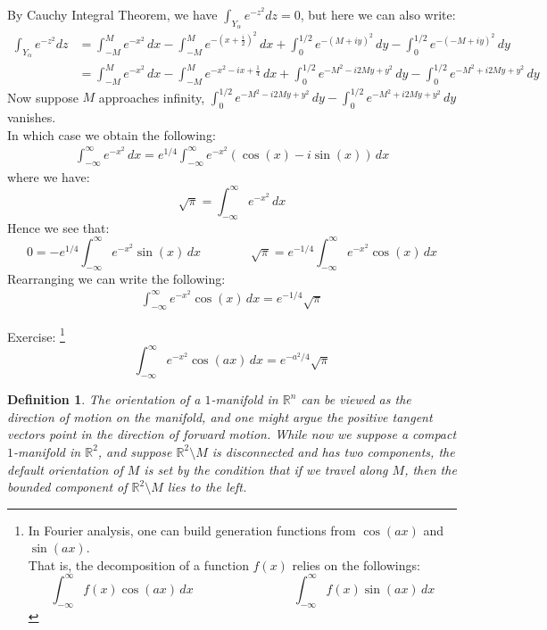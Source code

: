 \documentclass[11pt,oneside]{book}
\theoremstyle{break}
\theoremstyle{break}
\newtheorem{defn}{Definition}[corL]
\newcommand{\R}{\mathbb{R}}
\newcommand{\exercise}{\color{green}Exercise: \color{black}}
\begin{document}
By Cauchy Integral Theorem, we have $\int_{Y_\alpha} e^{-z^2} dz = 0$, but here we can also write:
\begin{align*}
\int_{Y_\alpha}e^{-z^2} dz &= \int_{-M}^M e^{-x^2}\, dx - \int_{-M}^M e^{-\left(x+\frac{i}{2}\right)^2} \,dx + \int_{0}^{1/2} e^{-(M+iy)^2} \, dy - \int_0^{1/2}e^{-(-M+iy)^2}\, dy\\
&= \int_{-M}^M e^{-x^2}\, dx - \int_{-M}^M e^{-x^2 - ix + \frac{1}{4}} \, dx + \int_0^{1/2} e^{-M^2 - i2My + y^2} \, dy - \int_0^{1/2} e^{-M^2 + i2My + y^2} \, dy
\end{align*}
Now suppose $M$ approaches infinity, $\int_0^{1/2} e^{-M^2 - i2My + y^2} \, dy - \int_0^{1/2} e^{-M^2 + i2My + y^2} \, dy$ vanishes.\\ 
In which case we obtain the following:
\begin{align*}
\int_{-\infty}^{\infty} e^{-x^2} \, dx = e^{1/4} \int_{-\infty}^\infty e^{-x^2} (\cos(x) - i \sin(x)) \, dx
\end{align*}
where we have: 
$$\sqrt{\pi} = \int_{-\infty}^{\infty} e^{-x^2} \, dx$$
Hence we see that:
$$0 = -e^{1/4} \int_{-\infty}^{\infty} e^{-x^2} \sin(x) \, dx\qquad\qquad \sqrt{\pi} = e^{-1/4} \int_{-\infty}^\infty e^{-x^2} \cos(x) \, dx$$
Rearranging we can write the following:
\begin{align*}
\int_{-\infty}^{\infty} e^{-x^2} \cos(x) \, dx = e^{-1/4} \sqrt{\pi}
\end{align*}

\exercise\footnote{In Fourier analysis, one can build generation functions from $\cos(ax)$ and $\sin(ax)$. \\ ${}$\qquad That is, the decomposition of a function $f(x)$ relies on the followings:
$$\int_{-\infty}^\infty f(x) \cos(ax)\, dx \qquad\qquad\qquad\qquad \int_{-\infty}^\infty f(x) \sin(ax)\, dx$$} $$\int_{-\infty}^{\infty} e^{-x^2} \cos(ax)\,dx = e^{-a^2/4} \sqrt{\pi}$$


\hfill\break
\hfill\break

\begin{defn}
The orientation of a $1$-manifold in $\R^n$ can be viewed as the direction of motion on the manifold, and one might argue the positive tangent vectors point in the direction of forward motion. While now we suppose a compact $1$-manifold in $\R^2$, and suppose $\R^2 \setminus M$ is disconnected and has two components, the default orientation of $M$ is set by the condition that if we travel along $M$, then the bounded component of $\R^2 \setminus M$ lies to the left.
\end{defn}
\newpage
\end{document}
